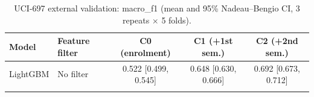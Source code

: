 \begin{table}[t]
\centering
\small
\caption{UCI-697 external validation: macro\_f1 (mean and 95\% Nadeau--Bengio CI, 3 repeats $\times$ 5 folds).}
\label{tab:uci697_macro_f1}
\begin{tabular}{llccc}
\toprule
Model & Feature filter & C0 (enrolment) & C1 (+1st sem.) & C2 (+2nd sem.) \\
\midrule
LightGBM & No filter & 0.522 [0.499, 0.545] & 0.648 [0.630, 0.666] & 0.692 [0.673, 0.712] \\
\addlinespace
\bottomrule
\end{tabular}
\end{table}